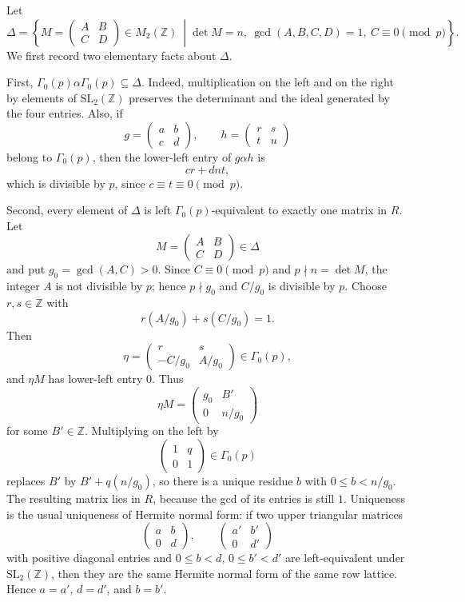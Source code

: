 \begin{solution}
Let
\[
\Delta=
\left\{
M=
\begin{pmatrix}
A & B\\
C & D
\end{pmatrix}
\in M_2(\mathbb{Z})
\ \middle|
\det M=n,\ \gcd(A,B,C,D)=1,\ C\equiv 0 \pmod p
\right\}.
\]
We first record two elementary facts about $\Delta$.

First, $\Gamma_0(p)\alpha\Gamma_0(p)\subseteq \Delta$. Indeed, multiplication on the left and on the right by elements of $\mathrm{SL}_2(\mathbb{Z})$ preserves the determinant and the ideal generated by the four entries. Also, if
\[
g=
\begin{pmatrix}
a & b\\
c & d
\end{pmatrix},
\qquad
h=
\begin{pmatrix}
r & s\\
t & u
\end{pmatrix}
\]
belong to $\Gamma_0(p)$, then the lower-left entry of $g\alpha h$ is
\[
cr+dnt,
\]
which is divisible by $p$, since $c\equiv t\equiv 0\pmod p$.

Second, every element of $\Delta$ is left $\Gamma_0(p)$-equivalent to exactly one matrix in $R$. Let
\[
M=
\begin{pmatrix}
A & B\\
C & D
\end{pmatrix}
\in \Delta
\]
and put $g_0=\gcd(A,C)>0$. Since $C\equiv 0\pmod p$ and $p\nmid n=\det M$, the integer $A$ is not divisible by $p$; hence $p\nmid g_0$ and $C/g_0$ is divisible by $p$. Choose $r,s\in \mathbb{Z}$ with
\[
r(A/g_0)+s(C/g_0)=1.
\]
Then
\[
\eta=
\begin{pmatrix}
r & s\\
-C/g_0 & A/g_0
\end{pmatrix}
\in \Gamma_0(p),
\]
and $\eta M$ has lower-left entry $0$. Thus
\[
\eta M=
\begin{pmatrix}
g_0 & B'\\
0 & n/g_0
\end{pmatrix}
\]
for some $B'\in \mathbb{Z}$. Multiplying on the left by
\[
\begin{pmatrix}
1 & q\\
0 & 1
\end{pmatrix}
\in \Gamma_0(p)
\]
replaces $B'$ by $B'+q(n/g_0)$, so there is a unique residue $b$ with $0\leq b<n/g_0$. The resulting matrix lies in $R$, because the gcd of its entries is still $1$. Uniqueness is the usual uniqueness of Hermite normal form: if two upper triangular matrices
\[
\begin{pmatrix}
a & b\\
0 & d
\end{pmatrix},
\qquad
\begin{pmatrix}
a' & b'\\
0 & d'
\end{pmatrix}
\]
with positive diagonal entries and $0\leq b<d$, $0\leq b'<d'$ are left-equivalent under $\mathrm{SL}_2(\mathbb{Z})$, then they are the same Hermite normal form of the same row lattice. Hence $a=a'$, $d=d'$, and $b=b'$.


\end{solution}
